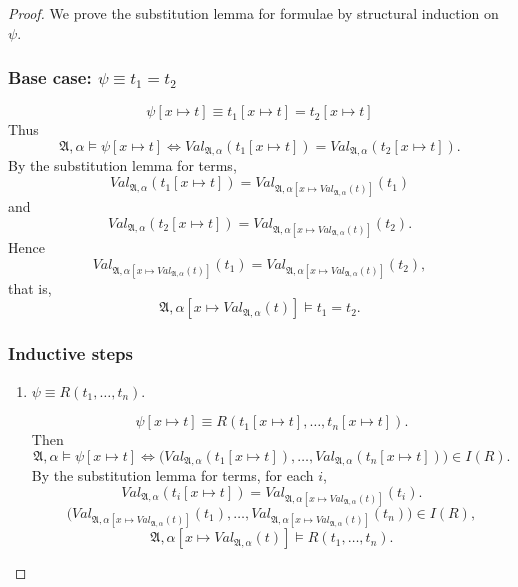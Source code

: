 \documentclass{article}
\begin{document}
\begin{proof}
    We prove the substitution lemma for formulae by structural induction on $\psi$.
    
    \subsubsection*{Base case: $\psi \equiv t_1 = t_2$}
    \[
    \psi[x \mapsto t] \equiv t_1[x \mapsto t] = t_2[x \mapsto t]
    \]
    Thus
    \[
    \mathfrak{A}, \alpha \models \psi[x \mapsto t]
    \iff
    Val_{\mathfrak{A}, \alpha}(t_1[x \mapsto t])
    =
    Val_{\mathfrak{A}, \alpha}(t_2[x \mapsto t]).
    \]
    By the substitution lemma for terms,
    \[
    Val_{\mathfrak{A}, \alpha}(t_1[x \mapsto t])
    =
    Val_{\mathfrak{A}, \alpha[x \mapsto Val_{\mathfrak{A}, \alpha}(t)]}(t_1)
    \]
    and
    \[
    Val_{\mathfrak{A}, \alpha}(t_2[x \mapsto t])
    =
    Val_{\mathfrak{A}, \alpha[x \mapsto Val_{\mathfrak{A}, \alpha}(t)]}(t_2).
    \]
    Hence
    \[
    Val_{\mathfrak{A}, \alpha[x \mapsto Val_{\mathfrak{A}, \alpha}(t)]}(t_1)
    =
    Val_{\mathfrak{A}, \alpha[x \mapsto Val_{\mathfrak{A}, \alpha}(t)]}(t_2),
    \]
    that is,
    \[
    \mathfrak{A}, \alpha[x \mapsto Val_{\mathfrak{A}, \alpha}(t)] \models t_1 = t_2.
    \]
    
    \subsubsection*{Inductive steps}
    \begin{enumerate}
        \item $\psi \equiv R(t_1, \dots, t_n)$.
    
        \[
        \psi[x \mapsto t] \equiv R(t_1[x \mapsto t], \dots, t_n[x \mapsto t]).
        \]
        Then
        \[
        \mathfrak{A}, \alpha \models \psi[x \mapsto t]
        \iff
        \bigl(Val_{\mathfrak{A}, \alpha}(t_1[x \mapsto t]), \dots, Val_{\mathfrak{A}, \alpha}(t_n[x \mapsto t])\bigr) \in I(R).
        \]
        By the substitution lemma for terms, for each $i$,
        \[
        Val_{\mathfrak{A}, \alpha}(t_i[x \mapsto t])
        =
        Val_{\mathfrak{A}, \alpha[x \mapsto Val_{\mathfrak{A}, \alpha}(t)]}(t_i).
        \]
        \[
        \bigl(Val_{\mathfrak{A}, \alpha[x \mapsto Val_{\mathfrak{A}, \alpha}(t)]}(t_1), \dots,
        Val_{\mathfrak{A}, \alpha[x \mapsto Val_{\mathfrak{A}, \alpha}(t)]}(t_n)\bigr) \in I(R),
        \]
        \[
        \mathfrak{A}, \alpha[x \mapsto Val_{\mathfrak{A}, \alpha}(t)] \models R(t_1, \dots, t_n).
        \]
    

\end{enumerate}
\end{proof}
\end{document}
